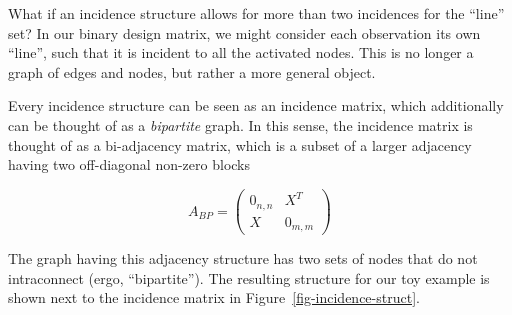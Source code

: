\documentclass[%
	12pt,
		oneside,
		letterpaper
]{book}
\begin{document}
What if an incidence structure allows for more than two incidences for
the ``line'' set? In our binary design matrix, we might consider each
observation its own ``line'', such that it is incident to all the
activated nodes. This is no longer a graph of edges and nodes, but
rather a more general object.

Every incidence structure can be seen as an incidence matrix, which
additionally can be thought of as a \emph{bipartite} graph. In this
sense, the incidence matrix is thought of as a bi-adjacency matrix,
which is a subset of a larger adjacency having two off-diagonal non-zero
blocks

\[
A_{BP} = 
\begin{pmatrix}
0_{n,n} & X^T \\
X & 0_{m,m}
\end{pmatrix}
\]

The graph having this adjacency structure has two sets of nodes that do
not intraconnect (ergo, ``bipartite''). The resulting structure for our
toy example is shown next to the incidence matrix in
Figure~\ref{fig-incidence-struct}.
\end{document}

